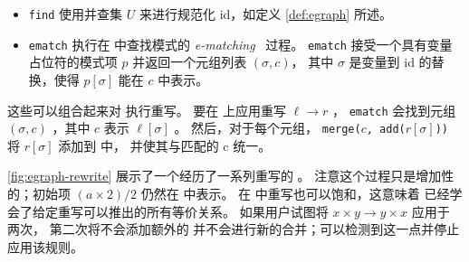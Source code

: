 \begin{itemize}
    \item \texttt{find} 使用并查集 $U$ 来进行规范化 \eclass id，如定义 \ref{def:egraph} 所述。
    \item \texttt{ematch} 执行在 \egraph 中查找模式的 
          \textit{e-matching}~\cite{simplify, ematching} 过程。 
          \texttt{ematch} 接受一个具有变量占位符的模式项 $p$ 并返回一个元组列表 $(\sigma, c)$，
          其中 $\sigma$ 是变量到 \eclass id 的替换，使得 $p[\sigma]$ 能在 \eclass $c$ 中表示。
\end{itemize}


这些可以组合起来对 \egraph 执行重写。
要在 \egraph 上应用重写 $\ell \to r$ ，
  \texttt{ematch} 会找到元组 $(\sigma, c)$ ，其中 \eclass $c$ 表示 $\ell[\sigma]$ 。
然后，对于每个元组，
  \mbox{\texttt{merge($c$, add($r[\sigma]$))}} 将 $r[\sigma]$ 添加到 \egraph 中，
  并使其与匹配的 \eclass c 统一。


\autoref{fig:egraph-rewrite} 展示了一个经历了一系列重写的 \egraph。
注意这个过程只是增加性的；初始项 $(a \times 2) / 2$ 仍然在 \egraph 中表示。
在 \egraph 中重写也可以饱和，这意味着 \egraph 已经学会了给定重写可以推出的所有等价关系。
如果用户试图将 $x \times y \to y \times x$ 应用于 \egraph 两次，
  第二次将不会添加额外的 \enodes 并不会进行新的合并；\egraph 可以检测到这一点并停止应用该规则。


